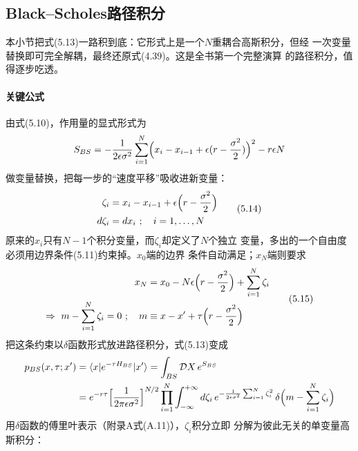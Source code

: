 \subsection{Black--Scholes路径积分}

本小节把式(5.13)一路积到底：它形式上是一个$N$重耦合高斯积分，但经
一次变量替换即可完全解耦，最终还原式(4.39)。这是全书第一个完整演算
的路径积分，值得逐步吃透。

\paragraph{关键公式}
由式(5.10)，作用量的显式形式为
\begin{equation*}
S_{BS}=-\frac{1}{2\epsilon\sigma^{2}}\sum_{i=1}^{N}
\Bigl(x_{i}-x_{i-1}+\epsilon(r-\frac{\sigma^{2}}{2})\Bigr)^{2}-r\epsilon N
\end{equation*}
做变量替换，把每一步的“速度平移”吸收进新变量：
\begin{equation*}
\begin{aligned}
\zeta_{i}&=x_{i}-x_{i-1}+\epsilon\Bigl(r-\frac{\sigma^{2}}{2}\Bigr)\\
d\zeta_{i}&=dx_{i}\ ;\quad i=1,\ldots,N
\end{aligned}
\tag{5.14}
\end{equation*}
原来的$x_{i}$只有$N-1$个积分变量，而$\zeta_{i}$却定义了$N$个独立
变量，多出的一个自由度必须用边界条件(5.11)约束掉。$x_{0}$端的边界
条件自动满足；$x_{N}$端则要求
\begin{equation*}
\begin{aligned}
x_{N}&=x_{0}-N\epsilon\Bigl(r-\frac{\sigma^{2}}{2}\Bigr)
+\sum_{i=1}^{N}\zeta_{i}\\
\Rightarrow\ m-\sum_{i=1}^{N}\zeta_{i}=0\ ;\quad
m&\equiv x-x'+\tau\Bigl(r-\frac{\sigma^{2}}{2}\Bigr)
\end{aligned}
\tag{5.15}
\end{equation*}
把这条约束以$\delta$函数形式放进路径积分，式(5.13)变成
\begin{align*}
p_{BS}(x,\tau;x')&=\langle x\vert e^{-\tau H_{BS}}\vert x'\rangle
=\int_{BS}\mathcal{D}X\,e^{S_{BS}}\\
&=e^{-r\tau}\Bigl[\frac{1}{2\pi\epsilon\sigma^{2}}\Bigr]^{N/2}
\prod_{i=1}^{N}\int_{-\infty}^{+\infty}d\zeta_{i}\,
e^{-\frac{1}{2\epsilon\sigma^{2}}\sum_{i=1}^{N}\zeta_{i}^{2}}\,
\delta\Bigl(m-\sum_{i=1}^{N}\zeta_{i}\Bigr)
\end{align*}
用$\delta$函数的傅里叶表示（附录A式(A.11)），$\zeta_{i}$积分立即
分解为彼此无关的单变量高斯积分：
